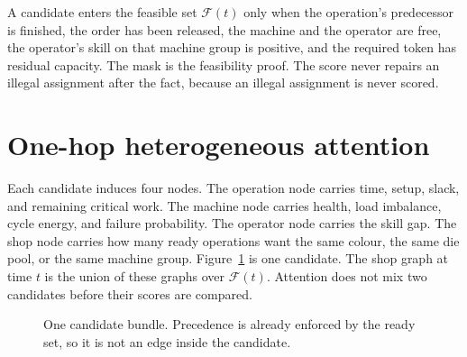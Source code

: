 \documentclass[10pt,a4paper]{article}
\begin{document}
A candidate enters the feasible set \(\mathcal{F}(t)\) only when the operation's predecessor is finished, the order has been released, the machine and the operator are free, the operator's skill on that machine group is positive, and the required token has residual capacity. The mask is the feasibility proof. The score never repairs an illegal assignment after the fact, because an illegal assignment is never scored.

\section{One-hop heterogeneous attention}

Each candidate induces four nodes. The operation node carries time, setup, slack, and remaining critical work. The machine node carries health, load imbalance, cycle energy, and failure probability. The operator node carries the skill gap. The shop node carries how many ready operations want the same colour, the same die pool, or the same machine group. Figure~\ref{fig:graph} is one candidate. The shop graph at time \(t\) is the union of these graphs over \(\mathcal{F}(t)\). Attention does not mix two candidates before their scores are compared.

\begin{figure}[ht]
\centering
{}
\caption{One candidate bundle. Precedence is already enforced by the ready set, so it is not an edge inside the candidate.}
\label{fig:graph}
\end{figure}
\end{document}
